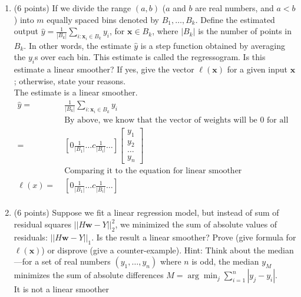 \documentclass[english]{article}
\newcommand{\bx}{\mathbf{x}}
\newcommand{\bw}{\mathbf{w}}
\begin{document}
\begin{enumerate}
\item (6 points) If we divide the range $(a,b)$ ($a$ and $b$ are real
  numbers, and $a<b$) into $m$ equally spaced bins denoted by
  $B_1,\ldots,B_k$.  Define the estimated output
  $\hat{y}=\frac{1}{|B_k|}\sum_{i:\bx_i\in B_k}y_i$, for $\bx\in B_k$,
  where $|B_k|$ is the number of points in $B_k$. In other words, the
  estimate $\hat{y}$ is a step function obtained by averaging the
  $y_i$s over each bin. This estimate is called the regressogram. Is
  this estimate a linear smoother? If yes, give the vector $\ell(\bx)$
  for a given input $\bx$; otherwise, state your reasons. \\
 The estimate is a linear smoother. \\
\begin{align*}
	\hat{y}=&\;\frac{1}{|B_k|}\sum_{i:\bx_i\in B_k}y_i \\ 
	&\;\text{By above, we know that the vector of weights will be 0 for all values except the bin the value is in} \\
	=&\; \left[ 0 \frac{1}{|B_1|} \ldots c \frac{1}{|B_i|} \ldots        \right]  \left[ 
					\begin{array}{c}
						y_1\\			y_2\\
						\ldots\\
						y_n
					\end{array}	       
        \right] \\
	&\;\text{Comparing it to the equation for linear smoother} \\
	\ell(x) =&\; \left[ 0 \frac{1}{|B_1|} \ldots c \frac{1}{|B_i|} \ldots  \right] \\
\end{align*}

\item (6 points) Suppose we fit a linear regression model, but instead
  of sum of residual squares $||H\bw-Y||_2^2$, we minimized the sum of
  absolute values of residuals: $||H\bw-Y||_1$. Is the result a linear
  smoother?  Prove (give formula for $\ell(\bx)$) or disprove (give a
  counter-example).  Hint: Think about the median---for a set of real
  numbers $(y_1,\ldots,y_n)$ where $n$ is odd, the median $y_M$
  minimizes the sum of absolute differences $M = \arg\min_j
  \sum_{i=1}^n |y_j - y_i|$. \\

It is not a linear smoother   \\


\end{enumerate}
\end{document}
